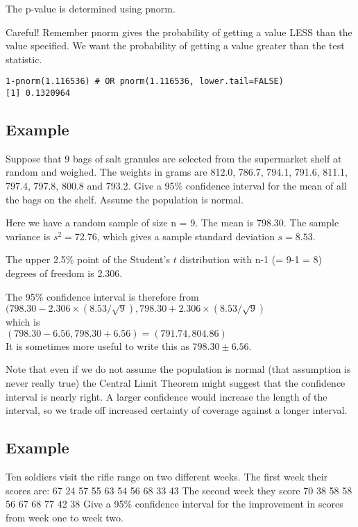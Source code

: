 The p-value is determined using pnorm.

Careful! Remember pnorm
gives the probability of getting a value LESS than the value specified. We want the probability of getting a value greater than
the test statistic.
\begin{verbatim}
1-pnorm(1.116536) # OR pnorm(1.116536, lower.tail=FALSE)
[1] 0.1320964
\end{verbatim}
\newpage




\subsection{Example}
Suppose that 9 bags of salt granules are selected from the supermarket
shelf at random and weighed. The weights in grams are 812.0, 786.7, 794.1,
791.6, 811.1, 797.4, 797.8, 800.8 and 793.2. Give a 95\% confidence interval for the
mean of all the bags on the shelf. Assume the population is normal.


Here we have a random sample of size n = 9. The mean is 798.30. The sample
variance is $s^2 = 72.76$, which gives a sample standard deviation $s = 8.53$.

The upper 2.5\% point of the Student's $t$ distribution with n-1 (= 9-1 = 8) degrees of freedom is 2.306.

The 95\% confidence interval is therefore from \\
$(798.30 - 2.306 \times (8.53/\sqrt{9}), 798.30 + 2.306 \times (8.53/\sqrt{9})$\\
which is\\
$(798.30 - 6.56, 798.30 + 6.56) = (791.74, 804.86)$\\
It is sometimes more useful to write this as $798.30 \pm 6.56$.

Note that even if we do not assume the population is normal (that assumption is
never really true) the Central Limit Theorem might suggest that the confidence interval
is nearly right. A larger confidence would increase the length of the interval, so we
trade off increased certainty of coverage against a longer interval.

\subsection{Example}
Ten soldiers visit the rifle range on two different weeks. The first
week their scores are:
67 24 57 55 63 54 56 68 33 43
The second week they score
70 38 58 58 56 67 68 77 42 38
Give a 95\% confidence interval for the improvement in scores from week one to
week two.


